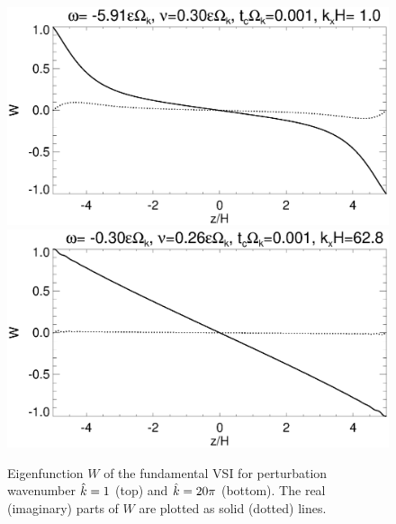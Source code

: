 
\begin{figure}
  \includegraphics[width=\linewidth,clip=true,trim=0cm 1.75cm 0cm
  0cm]{figures/eigenvector_iso_kx1} 
  \includegraphics[width=\linewidth]{figures/eigenvector_iso_kx60}
  \caption{Eigenfunction $W$ of the fundamental VSI for perturbation
    wavenumber $\hat{k}=1$ (top) and $\hat{k}=20\pi$ (bottom). The real 
    (imaginary) parts of $W$ are plotted as solid (dotted) lines. %
    \label{lowfreq_eigenfunc}
  }
\end{figure}

